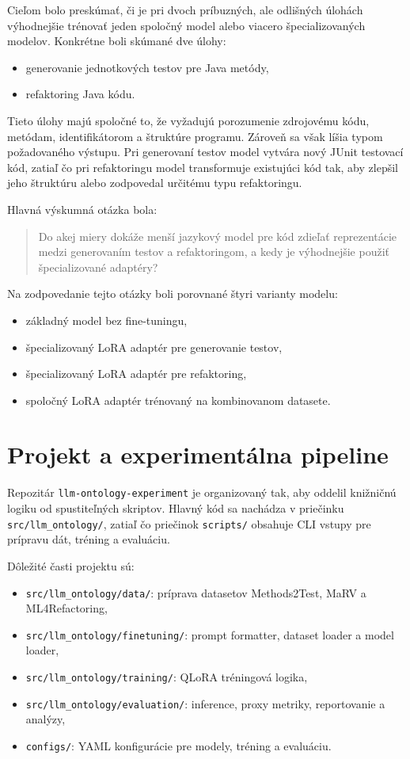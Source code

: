 \documentclass[11pt,a4paper]{article}
\newcommand{\projectname}{\texttt{llm-ontology-experiment}}
\begin{document}
Cieľom bolo preskúmať, či je pri dvoch príbuzných, ale odlišných úlohách výhodnejšie trénovať jeden spoločný model alebo viacero špecializovaných modelov. Konkrétne boli skúmané dve úlohy:
\begin{itemize}
\item generovanie jednotkových testov pre Java metódy,
\item refaktoring Java kódu.
\end{itemize}

Tieto úlohy majú spoločné to, že vyžadujú porozumenie zdrojovému kódu, metódam, identifikátorom a štruktúre programu. Zároveň sa však líšia typom požadovaného výstupu. Pri generovaní testov model vytvára nový JUnit testovací kód, zatiaľ čo pri refaktoringu model transformuje existujúci kód tak, aby zlepšil jeho štruktúru alebo zodpovedal určitému typu refaktoringu.

Hlavná výskumná otázka bola:

\begin{quote}
Do akej miery dokáže menší jazykový model pre kód zdieľať reprezentácie medzi generovaním testov a refaktoringom, a kedy je výhodnejšie použiť špecializované adaptéry?
\end{quote}

Na zodpovedanie tejto otázky boli porovnané štyri varianty modelu:
\begin{itemize}
\item základný model bez fine-tuningu,
\item špecializovaný LoRA adaptér pre generovanie testov,
\item špecializovaný LoRA adaptér pre refaktoring,
\item spoločný LoRA adaptér trénovaný na kombinovanom datasete.
\end{itemize}

\section{Projekt a experimentálna pipeline}

Repozitár \projectname{} je organizovaný tak, aby oddelil knižničnú logiku od spustiteľných skriptov. Hlavný kód sa nachádza v priečinku \texttt{src/llm\_ontology/}, zatiaľ čo priečinok \texttt{scripts/} obsahuje CLI vstupy pre prípravu dát, tréning a evaluáciu.

Dôležité časti projektu sú:
\begin{itemize}
\item \texttt{src/llm\_ontology/data/}: príprava datasetov Methods2Test, MaRV a ML4Refactoring,
\item \texttt{src/llm\_ontology/finetuning/}: prompt formatter, dataset loader a model loader,
\item \texttt{src/llm\_ontology/training/}: QLoRA tréningová logika,
\item \texttt{src/llm\_ontology/evaluation/}: inference, proxy metriky, reportovanie a analýzy,
\item \texttt{configs/}: YAML konfigurácie pre modely, tréning a evaluáciu.
\end{itemize}
\end{document}
